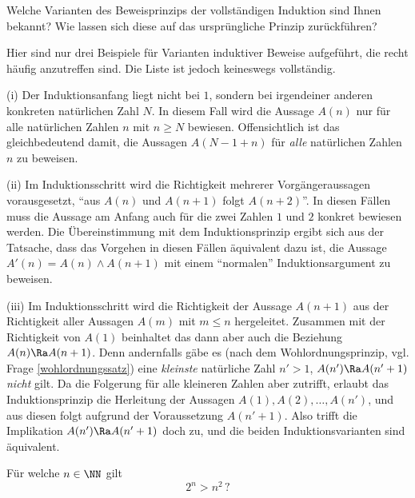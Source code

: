 \begin{frage} 
  Welche Varianten des Beweisprinzips der vollständigen Induktion 
  sind Ihnen bekannt? 
  Wie lassen sich diese auf das ursprüngliche Prinzip zurückführen?
\end{frage}

\begin{antwort}
  Hier sind nur drei Beispiele für Varianten induktiver Beweise aufgeführt, 
  die recht häufig anzutreffen sind. Die Liste ist jedoch 
  keineswegs vollständig.   

  \medskip\noindent
  (i) Der Induktionsanfang liegt nicht bei $1$, sondern bei irgendeiner 
  anderen konkreten natürlichen Zahl $N$. In diesem Fall wird die Aussage 
  $A(n)$ nur für alle natürlichen Zahlen $n$ mit $n\ge N$ bewiesen. 
  Offensichtlich ist das gleichbedeutend damit, die Aussagen $A(N-1+n)$ 
  für \textit{alle} natürlichen Zahlen $n$ zu beweisen. 

  \medskip\noindent
  (ii) Im Induktionsschritt wird die Richtigkeit mehrerer Vorgängeraussagen 
  vorausgesetzt, {\zB} "`aus $A(n)$ und $A(n+1)$ folgt $A(n+2)$"'. 
  In diesen Fällen muss die Aussage am Anfang auch für die zwei 
  Zahlen $1$ und $2$ konkret bewiesen werden. Die Übereinstimmung mit dem
  Induktionsprinzip ergibt sich aus der Tatsache, 
  dass das Vorgehen in diesen Fällen äquivalent dazu ist, die Aussage 
  $A'(n)=A(n) \wedge A(n+1)$ mit einem "`normalen"' Induktionsargument 
  zu beweisen.
  
  \medskip\noindent
  (iii) Im Induktionsschritt wird die Richtigkeit der Aussage $A(n+1)$ 
  aus der Richtigkeit aller Aussagen $A(m)$ mit $m\le n$ hergeleitet. 
  Zusammen mit der Richtigkeit von $A(1)$ beinhaltet das dann 
  aber auch die Beziehung $A(n) \Ra A(n+1)$. 
  Denn andernfalls gäbe es (nach dem Wohlordnungsprinzip, vgl. Frage 
  \ref{wohlordnungssatz}) 
  eine \textit{kleinste} natürliche Zahl $n'>1$, {\sd} $A(n') \Ra A(n'+1)$ 
  \textit{nicht} gilt. Da die 
  Folgerung für alle kleineren Zahlen aber zutrifft, erlaubt das 
  Induktionsprinzip die Herleitung der Aussagen 
  $A(1),A(2),\ldots,A(n')$, und 
  aus diesen folgt aufgrund der Voraussetzung $A(n'+1)$. Also trifft die 
  Implikation $A(n') \Ra A(n'+1)$ doch zu, und die beiden Induktionsvarianten 
  sind äquivalent.
  \AntEnd
\end{antwort}


\begin{frage}
  Für welche $n\in\NN$ gilt
  \[
  2^n > n^2\,? 
  \]
\end{frage}

